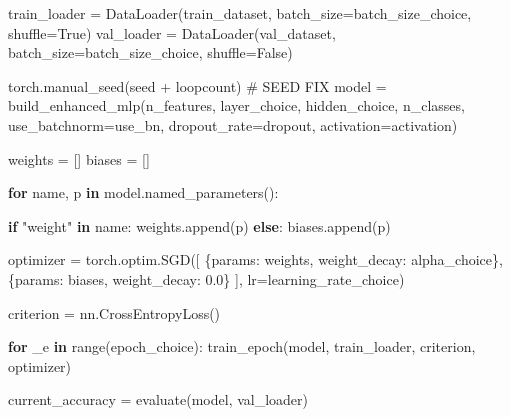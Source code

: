 \documentclass[
  letterpaper,
  DIV=11,
  numbers=noendperiod]{scrartcl}
\newenvironment{Shaded}{\begin{snugshade}}{\end{snugshade}}
\newcommand{\BuiltInTok}[1]{\textcolor[rgb]{0.00,0.23,0.31}{#1}}
\newcommand{\CommentTok}[1]{\textcolor[rgb]{0.37,0.37,0.37}{#1}}
\newcommand{\ControlFlowTok}[1]{\textcolor[rgb]{0.00,0.23,0.31}{\textbf{#1}}}
\newcommand{\FloatTok}[1]{\textcolor[rgb]{0.68,0.00,0.00}{#1}}
\newcommand{\KeywordTok}[1]{\textcolor[rgb]{0.00,0.23,0.31}{\textbf{#1}}}
\newcommand{\NormalTok}[1]{\textcolor[rgb]{0.00,0.23,0.31}{#1}}
\newcommand{\OperatorTok}[1]{\textcolor[rgb]{0.37,0.37,0.37}{#1}}
\newcommand{\StringTok}[1]{\textcolor[rgb]{0.13,0.47,0.30}{#1}}
\newcommand{\VariableTok}[1]{\textcolor[rgb]{0.07,0.07,0.07}{#1}}
\begin{document}
\begin{Shaded}
\begin{Highlighting}[]
\NormalTok{        train\_loader }\OperatorTok{=}\NormalTok{ DataLoader(train\_dataset, batch\_size}\OperatorTok{=}\NormalTok{batch\_size\_choice, shuffle}\OperatorTok{=}\VariableTok{True}\NormalTok{)}
\NormalTok{        val\_loader }\OperatorTok{=}\NormalTok{ DataLoader(val\_dataset, batch\_size}\OperatorTok{=}\NormalTok{batch\_size\_choice, shuffle}\OperatorTok{=}\VariableTok{False}\NormalTok{)}

\NormalTok{        torch.manual\_seed(seed }\OperatorTok{+}\NormalTok{ loopcount) }\CommentTok{\# SEED FIX}
\NormalTok{        model }\OperatorTok{=}\NormalTok{ build\_enhanced\_mlp(n\_features, layer\_choice, hidden\_choice, n\_classes,}
\NormalTok{                                  use\_batchnorm}\OperatorTok{=}\NormalTok{use\_bn, dropout\_rate}\OperatorTok{=}\NormalTok{dropout, activation}\OperatorTok{=}\NormalTok{activation)}

\NormalTok{        weights }\OperatorTok{=}\NormalTok{ []}
\NormalTok{        biases }\OperatorTok{=}\NormalTok{ []}
        
        \ControlFlowTok{for}\NormalTok{ name, p }\KeywordTok{in}\NormalTok{ model.named\_parameters():}
            
            \ControlFlowTok{if} \StringTok{"weight"} \KeywordTok{in}\NormalTok{ name:}
\NormalTok{                weights.append(p)}
            \ControlFlowTok{else}\NormalTok{:}
\NormalTok{                biases.append(p)}
                
\NormalTok{        optimizer }\OperatorTok{=}\NormalTok{ torch.optim.SGD([}
\NormalTok{            \{}\StringTok{\textquotesingle{}params\textquotesingle{}}\NormalTok{: weights, }\StringTok{\textquotesingle{}weight\_decay\textquotesingle{}}\NormalTok{: alpha\_choice\},}
\NormalTok{            \{}\StringTok{\textquotesingle{}params\textquotesingle{}}\NormalTok{: biases, }\StringTok{\textquotesingle{}weight\_decay\textquotesingle{}}\NormalTok{: }\FloatTok{0.0}\NormalTok{\}}
\NormalTok{        ], lr}\OperatorTok{=}\NormalTok{learning\_rate\_choice)}

\NormalTok{        criterion }\OperatorTok{=}\NormalTok{ nn.CrossEntropyLoss()}

        \ControlFlowTok{for}\NormalTok{ \_e }\KeywordTok{in} \BuiltInTok{range}\NormalTok{(epoch\_choice):}
\NormalTok{            train\_epoch(model, train\_loader, criterion, optimizer)}

\NormalTok{        current\_accuracy }\OperatorTok{=}\NormalTok{ evaluate(model, val\_loader)}


\end{Highlighting}
\end{Shaded}
\end{document}
